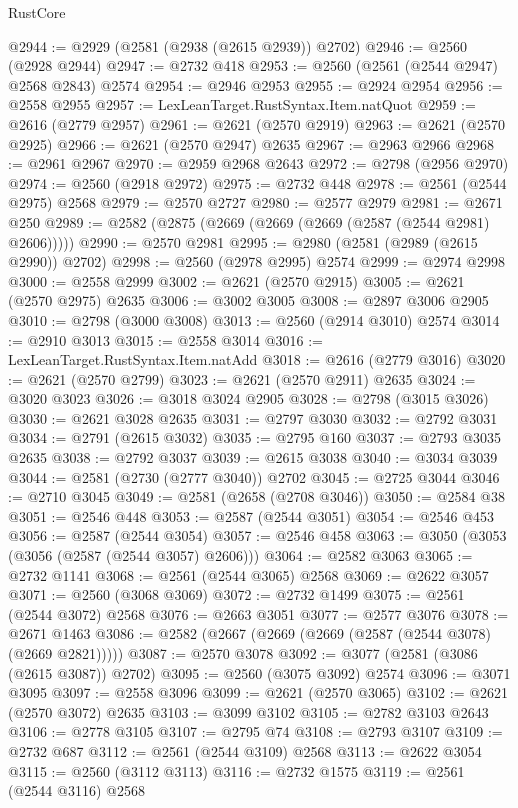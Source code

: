 \begin{lexlean}{RustCore}
\begin{coremodule}
@2944 := @2929 (@2581 (@2938 (@2615 @2939)) @2702)
@2946 := @2560 (@2928 @2944)
@2947 := @2732 @418
@2953 := @2560 (@2561 (@2544 @2947) @2568 @2843) @2574
@2954 := @2946 @2953
@2955 := @2924 @2954
@2956 := @2558 @2955
@2957 := LexLeanTarget.RustSyntax.Item.natQuot
@2959 := @2616 (@2779 @2957)
@2961 := @2621 (@2570 @2919)
@2963 := @2621 (@2570 @2925)
@2966 := @2621 (@2570 @2947) @2635
@2967 := @2963 @2966
@2968 := @2961 @2967
@2970 := @2959 @2968 @2643
@2972 := @2798 (@2956 @2970)
@2974 := @2560 (@2918 @2972)
@2975 := @2732 @448
@2978 := @2561 (@2544 @2975) @2568
@2979 := @2570 @2727
@2980 := @2577 @2979
@2981 := @2671 @250
@2989 := @2582 (@2875 (@2669 (@2669 (@2669 (@2587 (@2544 @2981) @2606)))))
@2990 := @2570 @2981
@2995 := @2980 (@2581 (@2989 (@2615 @2990)) @2702)
@2998 := @2560 (@2978 @2995) @2574
@2999 := @2974 @2998
@3000 := @2558 @2999
@3002 := @2621 (@2570 @2915)
@3005 := @2621 (@2570 @2975) @2635
@3006 := @3002 @3005
@3008 := @2897 @3006 @2905
@3010 := @2798 (@3000 @3008)
@3013 := @2560 (@2914 @3010) @2574
@3014 := @2910 @3013
@3015 := @2558 @3014
@3016 := LexLeanTarget.RustSyntax.Item.natAdd
@3018 := @2616 (@2779 @3016)
@3020 := @2621 (@2570 @2799)
@3023 := @2621 (@2570 @2911) @2635
@3024 := @3020 @3023
@3026 := @3018 @3024 @2905
@3028 := @2798 (@3015 @3026)
@3030 := @2621 @3028 @2635
@3031 := @2797 @3030
@3032 := @2792 @3031
@3034 := @2791 (@2615 @3032)
@3035 := @2795 @160
@3037 := @2793 @3035 @2635
@3038 := @2792 @3037
@3039 := @2615 @3038
@3040 := @3034 @3039
@3044 := @2581 (@2730 (@2777 @3040)) @2702
@3045 := @2725 @3044
@3046 := @2710 @3045
@3049 := @2581 (@2658 (@2708 @3046))
@3050 := @2584 @38
@3051 := @2546 @448
@3053 := @2587 (@2544 @3051)
@3054 := @2546 @453
@3056 := @2587 (@2544 @3054)
@3057 := @2546 @458
@3063 := @3050 (@3053 (@3056 (@2587 (@2544 @3057) @2606)))
@3064 := @2582 @3063
@3065 := @2732 @1141
@3068 := @2561 (@2544 @3065) @2568
@3069 := @2622 @3057
@3071 := @2560 (@3068 @3069)
@3072 := @2732 @1499
@3075 := @2561 (@2544 @3072) @2568
@3076 := @2663 @3051
@3077 := @2577 @3076
@3078 := @2671 @1463
@3086 := @2582 (@2667 (@2669 (@2669 (@2587 (@2544 @3078) (@2669 @2821)))))
@3087 := @2570 @3078
@3092 := @3077 (@2581 (@3086 (@2615 @3087)) @2702)
@3095 := @2560 (@3075 @3092) @2574
@3096 := @3071 @3095
@3097 := @2558 @3096
@3099 := @2621 (@2570 @3065)
@3102 := @2621 (@2570 @3072) @2635
@3103 := @3099 @3102
@3105 := @2782 @3103 @2643
@3106 := @2778 @3105
@3107 := @2795 @74
@3108 := @2793 @3107
@3109 := @2732 @687
@3112 := @2561 (@2544 @3109) @2568
@3113 := @2622 @3054
@3115 := @2560 (@3112 @3113)
@3116 := @2732 @1575
@3119 := @2561 (@2544 @3116) @2568

\end{coremodule}
\end{lexlean}
